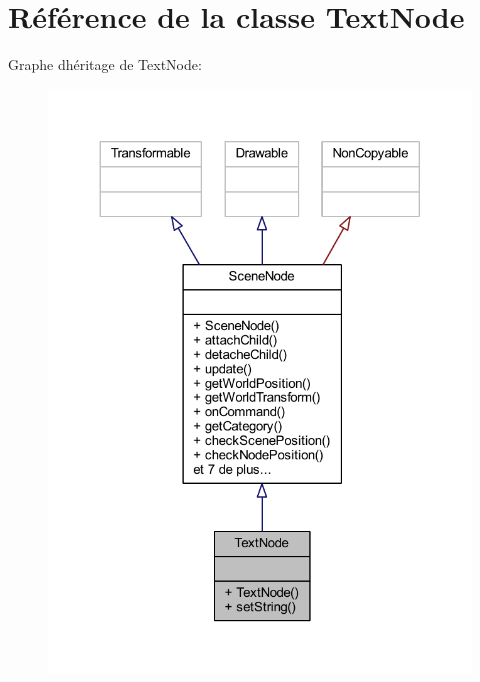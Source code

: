 \hypertarget{class_text_node}{}\section{Référence de la classe Text\+Node}
\label{class_text_node}


Graphe d\textquotesingle{}héritage de Text\+Node\+:\nopagebreak
\begin{figure}[H]
\begin{center}
\leavevmode
\includegraphics[width=324pt]{class_text_node__inherit__graph}
\end{center}
\end{figure}


